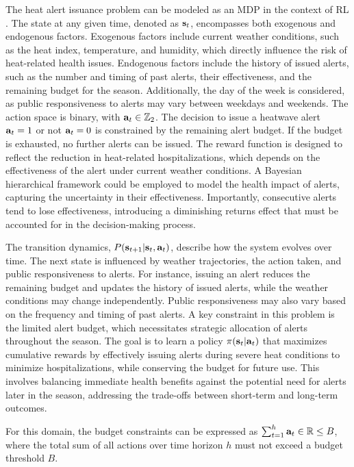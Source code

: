 The heat alert issuance problem can be modeled as an MDP in the context of RL \cite{considine2023optimizing}. The state at any given time, denoted as  ${\mathbf{s}}_t$, encompasses both exogenous and endogenous factors. Exogenous factors include current weather conditions, such as the heat index, temperature, and humidity, which directly influence the risk of heat-related health issues. Endogenous factors include the history of issued alerts, such as the number and timing of past alerts, their effectiveness, and the remaining budget for the season. Additionally, the day of the week is considered, as public responsiveness to alerts may vary between weekdays and weekends.
The action space is binary, with ${\mathbf{a}}_t\in\mathbb{Z}_2$. The decision to issue a heatwave alert ${\mathbf{a}}_t=1$ or not ${\mathbf{a}}_t=0$ is constrained by the remaining alert budget. If the budget is exhausted, no further alerts can be issued. The reward function is designed to reflect the reduction in heat-related hospitalizations, which depends on the effectiveness of the alert under current weather conditions. A Bayesian hierarchical framework could be employed to model the health impact of alerts, capturing the uncertainty in their effectiveness. Importantly, consecutive alerts tend to lose effectiveness, introducing a diminishing returns effect that must be accounted for in the decision-making process.

The transition dynamics, 
$P({\mathbf{s}}_{t+1} | {\mathbf{s}}_t, {\mathbf{a}}_t)$, describe how the system evolves over time. The next state is influenced by weather trajectories, the action taken, and public responsiveness to alerts. For instance, issuing an alert reduces the remaining budget and updates the history of issued alerts, while the weather conditions may change independently. Public responsiveness may also vary based on the frequency and timing of past alerts.
A key constraint in this problem is the limited alert budget, which necessitates strategic allocation of alerts throughout the season. The goal is to learn a policy 
$\pi({\mathbf{s}}_t|{\mathbf{a}}_t)$ that maximizes cumulative rewards by effectively issuing alerts during severe heat conditions to minimize hospitalizations, while conserving the budget for future use. This involves balancing immediate health benefits against the potential need for alerts later in the season, addressing the trade-offs between short-term and long-term outcomes.


For this domain, the budget constraints can be expressed as $\sum_{t=1}^h {\mathbf{a}}_t\in\mathbb{R}\leq B$, where the total sum of all actions over time horizon $h$ must not exceed a budget threshold $B$.



